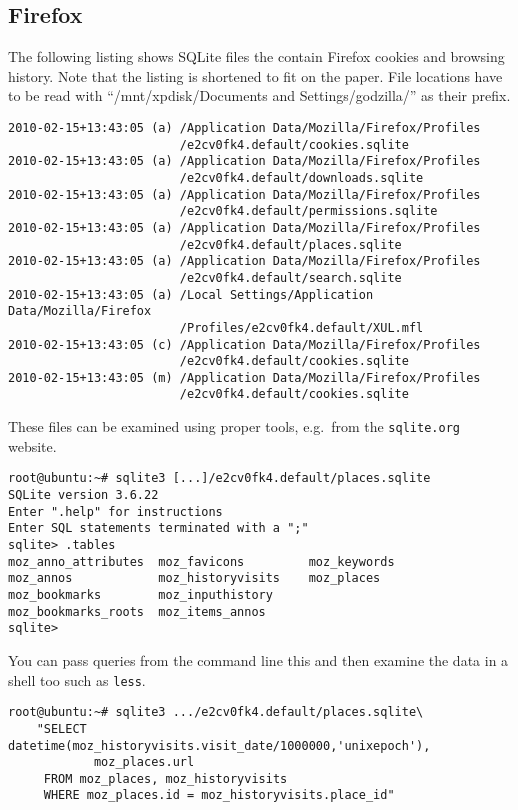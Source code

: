\documentclass[a4paper,
    11pt,
    normalheadings,
    parindent,
    UKenglish,
    abstracton,
    ]{scrartcl}
\begin{document}
\subsection{Firefox}
The following listing shows SQLite files the contain Firefox cookies and browsing history.
Note that the listing is shortened to fit on the paper.
File locations have to be read with ``/mnt/xpdisk/Documents and Settings/godzilla/'' as their prefix.
\begin{verbatim}
2010-02-15+13:43:05 (a) /Application Data/Mozilla/Firefox/Profiles
                        /e2cv0fk4.default/cookies.sqlite
2010-02-15+13:43:05 (a) /Application Data/Mozilla/Firefox/Profiles
                        /e2cv0fk4.default/downloads.sqlite
2010-02-15+13:43:05 (a) /Application Data/Mozilla/Firefox/Profiles
                        /e2cv0fk4.default/permissions.sqlite
2010-02-15+13:43:05 (a) /Application Data/Mozilla/Firefox/Profiles
                        /e2cv0fk4.default/places.sqlite
2010-02-15+13:43:05 (a) /Application Data/Mozilla/Firefox/Profiles
                        /e2cv0fk4.default/search.sqlite
2010-02-15+13:43:05 (a) /Local Settings/Application Data/Mozilla/Firefox
                        /Profiles/e2cv0fk4.default/XUL.mfl
2010-02-15+13:43:05 (c) /Application Data/Mozilla/Firefox/Profiles
                        /e2cv0fk4.default/cookies.sqlite
2010-02-15+13:43:05 (m) /Application Data/Mozilla/Firefox/Profiles
                        /e2cv0fk4.default/cookies.sqlite
\end{verbatim}

These files can be examined using proper tools, e.g.\, from the \texttt{sqlite.org} website.
\begin{verbatim}
root@ubuntu:~# sqlite3 [...]/e2cv0fk4.default/places.sqlite
SQLite version 3.6.22
Enter ".help" for instructions
Enter SQL statements terminated with a ";"
sqlite> .tables
moz_anno_attributes  moz_favicons         moz_keywords
moz_annos            moz_historyvisits    moz_places
moz_bookmarks        moz_inputhistory
moz_bookmarks_roots  moz_items_annos
sqlite>
\end{verbatim}

You can pass queries from the command line this and then examine the data in a shell too such as {\tt less}.
\begin{verbatim}
root@ubuntu:~# sqlite3 .../e2cv0fk4.default/places.sqlite\
    "SELECT datetime(moz_historyvisits.visit_date/1000000,'unixepoch'),
            moz_places.url
     FROM moz_places, moz_historyvisits
     WHERE moz_places.id = moz_historyvisits.place_id"
\end{verbatim}
\end{document}
